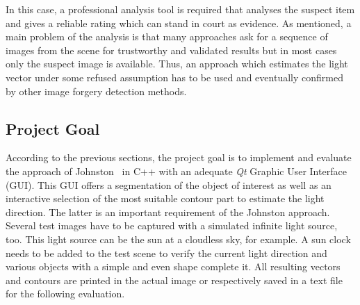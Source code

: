 In this case, a professional analysis tool is required that analyses the suspect item and gives a reliable rating which can stand in court as evidence. As mentioned, a main problem of the analysis is that many approaches ask for a sequence of images from the scene for trustworthy and validated results but in most cases only the suspect image is available. Thus, an approach which estimates the light vector under some refused assumption has to be used and eventually confirmed by other image forgery detection methods. 

\subsection{Project Goal}\label{sec:Project Goal}

According to the previous sections, the project goal is to implement and evaluate the approach of Johnston~\cite{Johnson} in C++ with an adequate \textit{Qt} Graphic User Interface (GUI). This GUI offers a segmentation of the object of interest as well as an interactive selection of the most suitable contour part to estimate the light direction. The latter is an important requirement of the Johnston approach. Several test images have to be captured with a simulated infinite light source, too. This light source can be the sun at a cloudless sky, for example. A sun clock needs to be added to the test scene to verify the current light direction and various objects with a simple and even shape complete it. All resulting vectors and contours are printed in the actual image or respectively saved in a text file for the following evaluation.



\newpage


















